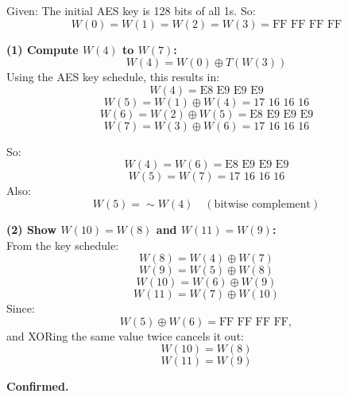\documentclass[12pt]{article}
\begin{document}
Given: The initial AES key is 128 bits of all 1s. So:
\[
W(0) = W(1) = W(2) = W(3) = \text{FF FF FF FF}
\]

\textbf{(1) Compute \( W(4) \) to \( W(7) \):} \\
\[
W(4) = W(0) \oplus T(W(3))
\]
Using the AES key schedule, this results in:
\[
W(4) = \text{E8 E9 E9 E9}
\]
\[
W(5) = W(1) \oplus W(4) = \text{17 16 16 16}
\]
\[
W(6) = W(2) \oplus W(5) = \text{E8 E9 E9 E9}
\]
\[
W(7) = W(3) \oplus W(6) = \text{17 16 16 16}
\]

So:
\[
W(4) = W(6) = \text{E8 E9 E9 E9}
\]
\[
W(5) = W(7) = \text{17 16 16 16}
\]
Also:
\[
W(5) = \sim W(4) \quad (\text{bitwise complement})
\]

\textbf{(2) Show \( W(10) = W(8) \) and \( W(11) = W(9) \):} \\
From the key schedule:
\[
W(8) = W(4) \oplus W(7)
\]
\[
W(9) = W(5) \oplus W(8)
\]
\[
W(10) = W(6) \oplus W(9)
\]
\[
W(11) = W(7) \oplus W(10)
\]
Since:
\[
W(5) \oplus W(6) = \text{FF FF FF FF},
\]
and XORing the same value twice cancels it out:
\[
W(10) = W(8)
\]
\[
W(11) = W(9)
\]

\textbf{Confirmed.}
\end{document}
